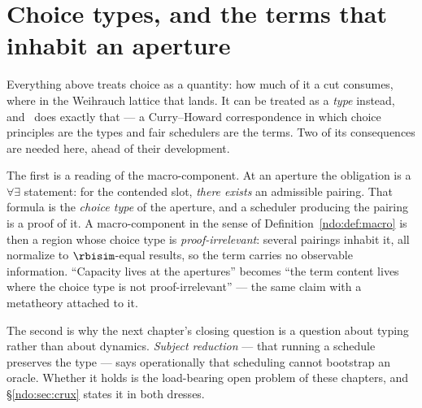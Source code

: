 \section{Choice types, and the terms that inhabit an aperture}\label{ndo:sec:types}

Everything above treats choice as a quantity: how much of it a cut consumes, where in
the Weihrauch lattice that lands. It can be treated as a \emph{type} instead, and
\chChs\ does exactly that --- a Curry--Howard correspondence in which choice principles
are the types and fair schedulers are the terms. Two of its consequences are needed
here, ahead of their development.

The first is a reading of the macro-component. At an aperture the obligation is a
$\forall\exists$ statement: for the contended slot, \emph{there exists} an admissible
pairing. That formula is the \emph{choice type} of the aperture, and a scheduler
producing the pairing is a proof of it. A macro-component in the sense of
Definition~\ref{ndo:def:macro} is then a region whose choice type is
\emph{proof-irrelevant}: several pairings inhabit it, all normalize to $\rbisim$-equal
results, so the term carries no observable information. ``Capacity lives at the
apertures'' becomes ``the term content lives where the choice type is not
proof-irrelevant'' --- the same claim with a metatheory attached to it.

The second is why the next chapter's closing question is a question about typing rather
than about dynamics. \emph{Subject reduction} --- that running a schedule preserves the
type --- says operationally that scheduling cannot bootstrap an oracle. Whether it holds
is the load-bearing open problem of these chapters, and \S\ref{ndo:sec:crux} states it in
both dresses.
